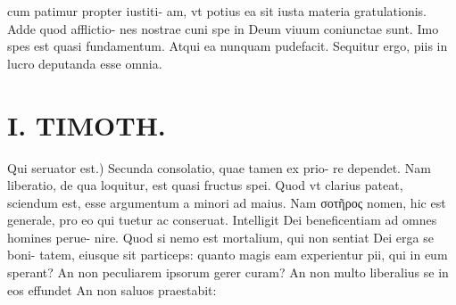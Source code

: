 \documentclass{article}
\begin{document}
\begin{pages}
cum patimur propter iustiti- am, vt potius ea sit iusta materia gratulationis. Adde quod afflictio- nes nostrae cuni spe in Deum viuum coniunctae sunt. Imo spes est quasi fundamentum. Atqui ea nunquam pudefacit. Sequitur ergo, piis in lucro deputanda esse omnia.  \pend
\section*{I. TIMOTH. }
\marginpar{[ p.51]}\pstart Qui seruator est.) Secunda consolatio, quae tamen ex prio- re dependet. Nam liberatio, de qua loquitur, est quasi fructus spei. Quod vt clarius pateat, sciendum est, esse argumentum a minori ad maius. Nam σοτῆρος nomen, hic est generale, pro eo qui tuetur ac conseruat. Intelligit Dei beneficentiam ad omnes homines perue- nire. Quod si nemo est mortalium, qui non sentiat Dei erga se boni- tatem, eiusque sit particeps: quanto magis eam experientur pii, qui in eum sperant? An non peculiarem ipsorum gerer curam? An non multo liberalius se in eos effundet An non saluos praestabit:  \pend
{}
{}

\end{pages}
\end{document}
